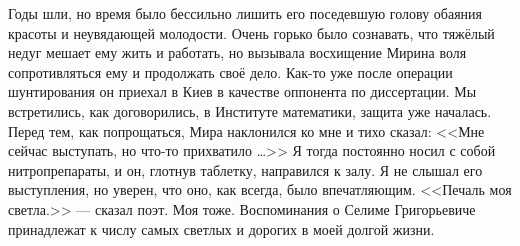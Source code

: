Годы шли, но время было бессильно лишить его поседевшую голову обаяния красоты и неувядающей молодости. Очень горько было сознавать, что тяжёлый недуг мешает ему жить и работать, но вызывала восхищение Мирина воля сопротивляться ему и продолжать своё дело. Как-то уже после операции шунтирования он приехал в Киев в качестве оппонента по диссертации. Мы встретились, как договорились, в Институте математики, защита уже началась. Перед тем, как попрощаться, Мира наклонился ко мне и тихо сказал: <<Мне сейчас выступать, но что-то прихватило \ldots>> Я тогда постоянно носил с собой нитропрепараты, и он, глотнув таблетку, направился к залу. Я не слышал его выступления, но уверен, что оно, как всегда, было впечатляющим.
<<Печаль моя светла.>> --- сказал поэт. Моя тоже. Воспоминания о Селиме Григорьевиче принадлежат к числу самых светлых и дорогих в моей долгой жизни.
